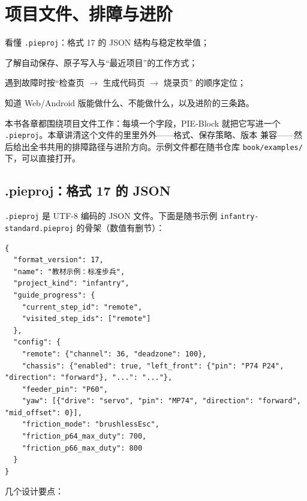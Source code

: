 \chapter{项目文件、排障与进阶}
\label{ch:projects}

\begin{introduction}
  \item 看懂 \texttt{.pieproj}：格式 17 的 JSON 结构与稳定枚举值；
  \item 了解自动保存、原子写入与“最近项目”的工作方式；
  \item 遇到故障时按“检查页 $\rightarrow$ 生成代码页 $\rightarrow$ 烧录页”
        的顺序定位；
  \item 知道 Web/Android 版能做什么、不能做什么，以及进阶的三条路。
\end{introduction}

本书各章都围绕项目文件工作：每填一个字段，PIE-Block 就把它写进一个
\texttt{.pieproj}。本章讲清这个文件的里里外外——格式、保存策略、版本
兼容——然后给出全书共用的排障路径与进阶方向。示例文件都在随书仓库
\texttt{book/examples/} 下，可以直接打开。

\section{.pieproj：格式 17 的 JSON}

\texttt{.pieproj} 是 UTF-8 编码的 JSON 文件。下面是随书示例
\texttt{infantry-standard.pieproj} 的骨架（数值有删节）：

\begin{lstlisting}[style=pieblockc,
  caption={\texttt{.pieproj} 格式 17 的结构（节选）},
  label={lst:ch10-pieproj}]
{
  "format_version": 17,
  "name": "教材示例：标准步兵",
  "project_kind": "infantry",
  "guide_progress": {
    "current_step_id": "remote",
    "visited_step_ids": ["remote"]
  },
  "config": {
    "remote": {"channel": 36, "deadzone": 100},
    "chassis": {"enabled": true, "left_front": {"pin": "P74 P24", "direction": "forward"}, "...": "..."},
    "feeder_pin": "P60",
    "yaw": [{"drive": "servo", "pin": "MP74", "direction": "forward", "mid_offset": 0}],
    "friction_mode": "brushlessEsc",
    "friction_p64_max_duty": 700,
    "friction_p66_max_duty": 800
  }
}
\end{lstlisting}

几个设计要点：

